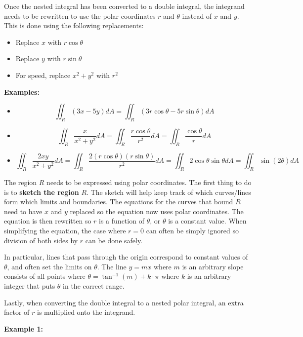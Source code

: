 \documentclass{article}
\begin{document}
Once the nested integral has been converted to a double integral, the integrand needs to be rewritten to use the polar coordinates \(r\) and \(\theta\) instead of \(x\) and \(y\). This is done using the following replacements:
\begin{itemize}
\item Replace \(x\) with \(r\cos\theta\)
\item Replace \(y\) with \(r\sin\theta\)
\item For speed, replace \(x^2 + y^2\) with \(r^2\) 
\end{itemize} 
\textbf{Examples:}
\begin{itemize}
\item
\[\iint_R (3x - 5y)dA = \iint_R (3r\cos\theta - 5r\sin\theta)dA\]
\item
\[\iint_R \frac{x}{x^2 + y^2}dA = \iint_R \frac{r\cos\theta}{r^2}dA = \iint_R \frac{\cos\theta}{r}dA\]
\item 
\[\iint_R \frac{2xy}{x^2 + y^2}dA = \iint_R \frac{2(r\cos\theta)(r\sin\theta)}{r^2}dA = \iint_R 2 \cos\theta \sin\theta dA = \iint_R \sin(2\theta) dA\]
\end{itemize}
The region \(R\) needs to be expressed using polar coordinates. The first thing to do is to {\bf sketch the region} \(R\). The sketch will help keep track of which curves/lines form which limits and boundaries. The equations for the curves that bound \(R\) need to have \(x\) and \(y\) replaced so the equation now uses polar coordinates. The equation is then rewritten so \(r\) is a function of \(\theta\), or \(\theta\) is a constant value. When simplifying the equation, the case where \(r = 0\) can often be simply ignored so division of both sides by \(r\) can be done safely.

In particular, lines that pass through the origin correspond to constant values of \(\theta\), and often set the limits on \(\theta\). The line \(y = mx\) where \(m\) is an arbitrary slope consists of all points where \(\theta = \tan^{-1}(m) + k \cdot \pi\) where \(k\) is an arbitrary integer that puts \(\theta\) in the correct range.   

Lastly, when converting the double integral to a nested polar integral, an extra factor of \(r\) is multiplied onto the integrand. 




\vspace{5mm}

\textbf{Example 1:}

\vspace{5mm}
\end{document}

